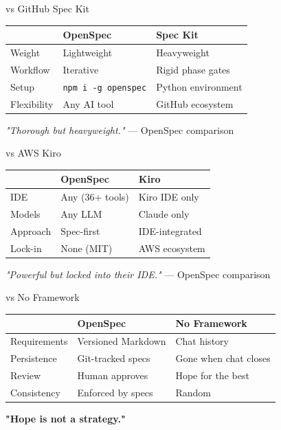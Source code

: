 \documentclass[aspectratio=169,18pt]{beamer}
\begin{document}
\begin{frame}{vs GitHub Spec Kit}
  \vspace{0.5em}
  \begin{tabularx}{\textwidth}{l X X}
    \toprule
    & \textbf{OpenSpec} & \textbf{Spec Kit} \\
    \midrule
    Weight      & Lightweight        & Heavyweight \\
    Workflow    & Iterative          & Rigid phase gates \\
    Setup       & \texttt{npm i -g openspec} & Python environment \\
    Flexibility & Any AI tool        & GitHub ecosystem \\
    \bottomrule
  \end{tabularx}
  \vspace{1em}
  \color{opengray}\textit{"Thorough but heavyweight."} — OpenSpec comparison
\end{frame}

\begin{frame}{vs AWS Kiro}
  \vspace{0.5em}
  \begin{tabularx}{\textwidth}{l X X}
    \toprule
    & \textbf{OpenSpec} & \textbf{Kiro} \\
    \midrule
    IDE      & Any (36+ tools)     & Kiro IDE only \\
    Models   & Any LLM             & Claude only \\
    Approach & Spec-first          & IDE-integrated \\
    Lock-in  & None (MIT)          & AWS ecosystem \\
    \bottomrule
  \end{tabularx}
  \vspace{1em}
  \color{opengray}\textit{"Powerful but locked into their IDE."} — OpenSpec comparison
\end{frame}

\begin{frame}{vs No Framework}
  \vspace{0.5em}
  \begin{tabularx}{\textwidth}{l X X}
    \toprule
    & \textbf{OpenSpec} & \textbf{No Framework} \\
    \midrule
    Requirements & Versioned Markdown  & Chat history \\
    Persistence  & Git-tracked specs   & Gone when chat closes \\
    Review       & Human approves      & Hope for the best \\
    Consistency  & Enforced by specs   & Random \\
    \bottomrule
  \end{tabularx}
  \vspace{1em}
  \Large\textbf{"Hope is not a strategy."}
\end{frame}
\end{document}
